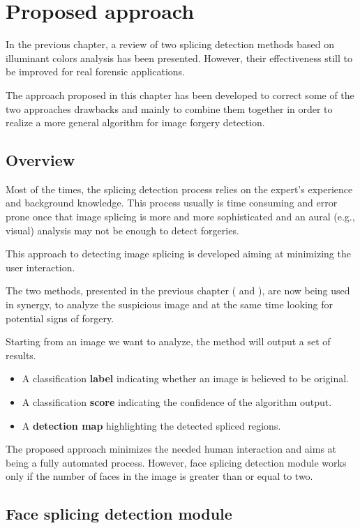 \chapter{Proposed approach}

In the previous chapter, a review of two splicing detection methods based on illuminant colors analysis has been presented. However, their effectiveness still to be improved for real forensic applications.

The approach proposed in this chapter has been developed to correct some of the two approaches drawbacks and mainly to combine them together in order to realize a more general algorithm for image forgery detection. 

\section{Overview}

Most of the times, the splicing detection process relies on the expert's experience and background knowledge. This process usually is time consuming and error prone once that image splicing is more and more sophisticated and an aural (e.g., visual) analysis may not be enough to detect forgeries.

This approach to detecting image splicing is developed aiming at minimizing the user interaction. 

The two methods, presented in the previous chapter (\cite{carvalho2016illuminant} and \cite{fan2015image}), are now being used in synergy, to analyze the suspicious image and at the same time looking for potential signs of forgery.

Starting from an image we want to analyze, the method will output a set of results.
\begin{itemize}
\item A classification \textbf{label} indicating whether an image is believed to be original.
\item A classification \textbf{score} indicating the confidence of the algorithm output.
\item A \textbf{detection map} highlighting the detected spliced regions.
\end{itemize}

The proposed approach minimizes the needed human interaction and aims at being a fully automated process. However, face splicing detection module works only if the number of faces in the image is greater than or equal to two.

\section{Face splicing detection module}

